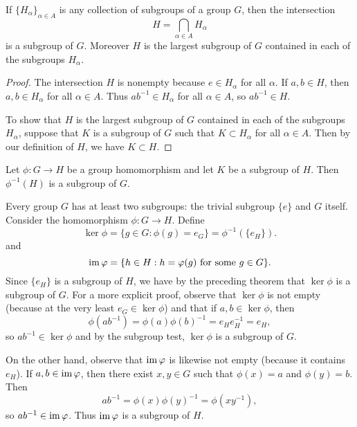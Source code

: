 \begin{theorem}
    \label{thm:intersection-subgroups}
    If \(\{H_{\alpha}\}_{\alpha \in A}\) is any collection of subgroups of a
    group \(G\), then the intersection
    \[
        H = \bigcap_{\alpha \in A} H_{\alpha}
    \]
    is a subgroup of \(G\). Moreover \(H\) is the largest subgroup of \(G\)
    contained in each of the subgroups \(H_{\alpha}\).
\end{theorem}

\begin{proof}
    The intersection \(H\) is nonempty because \(e \in H_\alpha\) for all
    \(\alpha\). If \(a, b \in H\), then \(a, b \in H_\alpha\) for all \(\alpha
    \in A\). Thus \(ab^{-1} \in H_\alpha\) for all \(\alpha \in A\), so
    \(ab^{-1} \in H\).

    To show that \(H\) is the largest subgroup of \(G\) contained in each of the
    subgroups \(H_{\alpha}\), suppose that \(K\) is a subgroup of \(G\) such
    that \(K \subset H_{\alpha}\) for all \(\alpha \in A\). Then by our
    definition of \(H\), we have \(K \subset H\).
\end{proof}

\begin{theorem}
    Let \(\phi: G \to H\) be a group homomorphism and let \(K\) be a subgroup of
    \(H\). Then \(\phi^{-1}(H)\) is a subgroup of \(G\).
\end{theorem}

\begin{remark}
    Every group \(G\) has at least two subgroups: the trivial subgroup \(\{e\}\)
    and \(G\) itself. Consider the homomorphism \(\phi: G \to H\). Define
    \[
        \ker \phi = \{g \in G : \phi(g) = e_G\} = \phi^{-1}(\{e_H\}).
    \]
    and
    \[
        \operatorname{im} \varphi = \{h \in H : h = \varphi(g) \text{ for some } g \in G\}.
    \]
    Since \(\{e_H\}\) is a subgroup of \(H\), we have by the preceding theorem
    that \(\ker \phi\) is a subgroup of \(G\). For a more explicit proof,
    observe that \(\ker \phi\) is not empty (because at the very least \(e_G \in
    \ker \phi\)) and that if \(a, b \in \ker \phi\), then 
    \[
        \phi(ab^{-1}) = \phi(a)\phi(b)^{-1} = e_H e_H^{-1} = e_H,
    \]
    so \(ab^{-1} \in \ker \phi\) and by the subgroup test, \(\ker \phi\) is a
    subgroup of \(G\).

    On the other hand, observe that \(\operatorname{im} \varphi\) is likewise not empty (because
    it contains \(e_H\)). If \(a, b \in \operatorname{im} \varphi\), then there exist \(x, y \in
    G\) such that \(\phi(x) = a\) and \(\phi(y) = b\). Then
    \[
        ab^{-1} = \phi(x)\phi(y)^{-1} = \phi(xy^{-1}),
    \]
    so \(ab^{-1} \in \operatorname{im} \varphi\). Thus \(\operatorname{im} \varphi\) is a subgroup of \(H\).
\end{remark}

